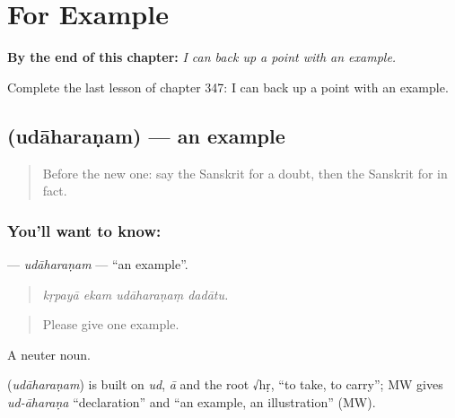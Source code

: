 
\chapter{For Example}
\label{ch:sa-for-example}

\begin{chapteropening}
\textbf{By the end of this chapter:} \emph{I can back up a point with an example.}

Complete the last lesson of chapter 347: I can back up a point with an example.
\end{chapteropening}

\section[\texorpdfstring{\sk{उदाहरणम्} (udāharaṇam)}{उदाहरणम् (udāharaṇam)}]{ (udāharaṇam) — an example}

\label{lesson:SA-C347-udaharanam}



\begin{quote}
Before the new one: say the Sanskrit for a doubt, then the Sanskrit for in fact.
\end{quote}

\subsection*{You'll want to know: }
\textbf{} — \emph{udāharaṇam} — \textquotedblleft{}an example\textquotedblright{}.

\begin{quote}
   
\end{quote}

\begin{quote}
\emph{kṛpayā ekam udāharaṇaṃ dadātu.}
\end{quote}

\begin{quote}
Please give one example.
\end{quote}

A neuter noun.

\begin{cousinweb}
\textbf{} (\emph{udāharaṇam}) is built on \emph{ud}, \emph{ā} and the root √hṛ, \textquotedblleft{}to take, to carry\textquotedblright{}; MW gives \emph{ud-āharaṇa} \textquotedblleft{}declaration\textquotedblright{} and \textquotedblleft{}an example, an illustration\textquotedblright{} (MW).
\end{cousinweb}

